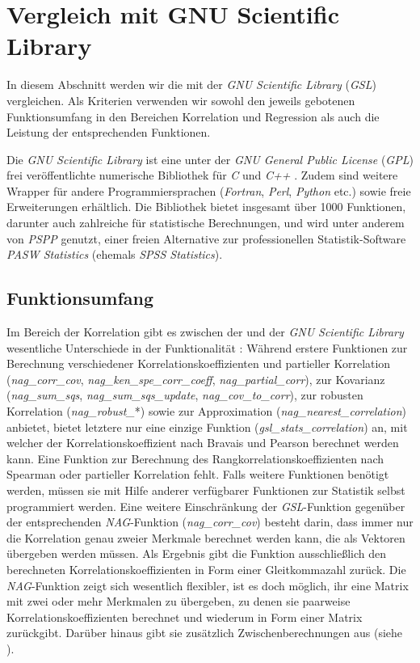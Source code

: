 \section{Vergleich mit GNU Scientific Library}

In diesem Abschnitt werden wir die \naglib mit der {\it GNU Scientific Library} ({\it GSL}) vergleichen. Als Kriterien verwenden wir sowohl den jeweils gebotenen Funktionsumfang in den Bereichen Korrelation und Regression als auch die Leistung der entsprechenden Funktionen.

Die {\it GNU Scientific Library} ist eine unter der {\it GNU General Public License} ({\it GPL}) frei veröffentlichte numerische Bibliothek für {\it C} und {\it C++} \cite{GSL2011}. Zudem sind weitere Wrapper für andere Programmiersprachen ({\it Fortran}, {\it Perl}, {\it Python} etc.) sowie freie Erweiterungen erhältlich. Die Bibliothek bietet insgesamt über 1000 Funktionen, darunter auch zahlreiche für statistische Berechnungen, und wird unter anderem von {\it PSPP} genutzt, einer freien Alternative zur professionellen Statistik-Software {\it PASW Statistics} (ehemals {\it SPSS Statistics}).

\subsection{Funktionsumfang}
\label{sec:funktionsumfang}

Im Bereich der Korrelation gibt es zwischen der \naglib und der {\it GNU Scientific Library} wesentliche Unterschiede in der Funktionalität \cite{gsl:correlation}: Während erstere Funktionen zur Berechnung verschiedener Korrelationskoeffizienten und partieller Korrelation ({\it nag\_corr\_cov}, {\it nag\_ken\_spe\_corr\_coeff}, {\it nag\_partial\_corr}), zur Kovarianz ({\it nag\_sum\_sqs}, {\it nag\_sum\_sqs\_update}, {\it nag\_cov\_to\_corr}), zur robusten Korrelation ({\it nag\_robust\_}*) sowie zur Approximation ({\it nag\_nearest\_correlation}) anbietet, bietet letztere nur eine einzige Funktion ({\it gsl\_stats\_correlation}) an, mit welcher der Korrelationskoeffizient nach Bravais und Pearson berechnet werden kann. Eine Funktion zur Berechnung des Rangkorrelationskoeffizienten nach Spearman oder partieller Korrelation fehlt. Falls weitere Funktionen benötigt werden, müssen sie mit Hilfe anderer verfügbarer Funktionen zur Statistik selbst programmiert werden. Eine weitere Einschränkung der {\it GSL}-Funktion gegenüber der entsprechenden {\it NAG}-Funktion ({\it nag\_corr\_cov}) besteht darin, dass immer nur die Korrelation genau zweier Merkmale berechnet werden kann, die als Vektoren übergeben werden müssen. Als Ergebnis gibt die Funktion ausschließlich den berechneten Korrelationskoeffizienten in Form einer Gleitkommazahl zurück. Die {\it NAG}-Funktion zeigt sich wesentlich flexibler, ist es doch möglich, ihr eine Matrix mit zwei oder mehr Merkmalen zu übergeben, zu denen sie paarweise Korrelationskoeffizienten berechnet und wiederum in Form einer Matrix zurückgibt. Darüber hinaus gibt sie zusätzlich Zwischenberechnungen aus (siehe ).

